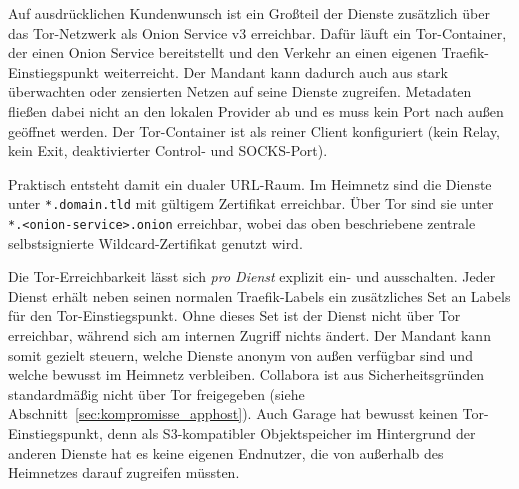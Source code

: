 Auf ausdrücklichen Kundenwunsch ist ein Großteil der Dienste zusätzlich über
das Tor-Netzwerk als Onion Service v3 erreichbar. Dafür läuft ein
Tor-Container, der einen Onion Service bereitstellt und den Verkehr an einen
eigenen Traefik-Einstiegspunkt weiterreicht. Der Mandant kann dadurch auch
aus stark überwachten oder zensierten Netzen auf seine Dienste zugreifen.
Metadaten fließen dabei nicht an den lokalen Provider ab und es muss kein
Port nach außen geöffnet werden. Der Tor-Container ist als reiner Client
konfiguriert (kein Relay, kein Exit, deaktivierter Control- und
\ac{SOCKS}-Port).

Praktisch entsteht damit ein dualer \ac{URL}-Raum. Im Heimnetz sind die
Dienste unter \texttt{*.domain.tld} mit gültigem Zertifikat erreichbar. Über
Tor sind sie unter \texttt{*.<onion-service>.onion} erreichbar, wobei das
oben beschriebene zentrale selbstsignierte Wildcard-Zertifikat genutzt wird.

Die Tor-Erreichbarkeit lässt sich \emph{pro Dienst} explizit ein- und
ausschalten. Jeder Dienst erhält neben seinen normalen Traefik-Labels ein
zusätzliches Set an Labels für den Tor-Einstiegspunkt. Ohne dieses Set ist
der Dienst nicht über Tor erreichbar, während sich am internen Zugriff nichts
ändert. Der Mandant kann somit gezielt steuern, welche Dienste anonym von
außen verfügbar sind und welche bewusst im Heimnetz verbleiben. Collabora ist
aus Sicherheitsgründen standardmäßig nicht über Tor freigegeben (siehe
Abschnitt~\ref{sec:kompromisse_apphost}). Auch Garage hat bewusst keinen
Tor-Einstiegspunkt, denn als \acs{S3}-kompatibler Objektspeicher im
Hintergrund der anderen Dienste hat es keine eigenen Endnutzer, die von
außerhalb des Heimnetzes darauf zugreifen müssten.

